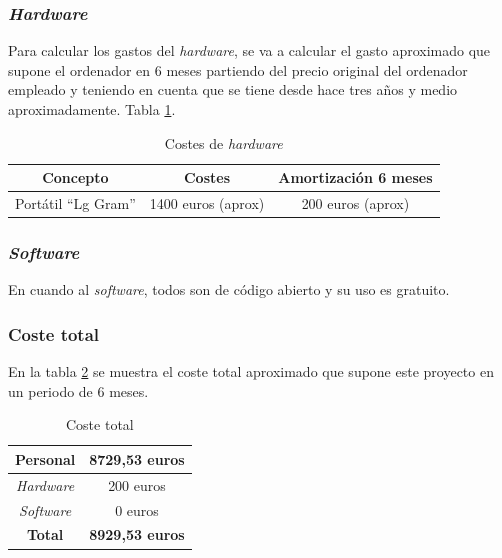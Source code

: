 \subsubsection{\textit{Hardware}}

Para calcular los gastos del \textit{hardware}, se va a calcular el gasto aproximado que supone el ordenador en 6 meses partiendo del precio original del ordenador empleado y teniendo en cuenta que se tiene desde hace tres años y medio aproximadamente. Tabla \ref{tab:hardware}.

\begin{table}[h]
    \centering
    \begin{tabular}{ccc}
        \toprule
        \textbf{Concepto} & \textbf{Costes} & \textbf{Amortización 6 meses}\\
        \toprule
        Portátil ``Lg Gram'' & 1400 euros (aprox) & 200 euros (aprox)\\
    \end{tabular}
    \caption{Costes de \textit{hardware}}
    \label{tab:hardware}
\end{table}

\subsubsection{\textit{Software}}

En cuando al \textit{software}, todos son de código abierto y su uso es gratuito.

\subsubsection{Coste total}

En la tabla \ref{tab:total} se muestra el coste total aproximado que supone este proyecto en un periodo de 6 meses. 

\begin{table}[h]
    \centering
    \begin{tabular}{cc}
        Personal & 8729,53 euros \\
        \toprule
        \textit{Hardware} & 200 euros\\
        \toprule
        \textit{Software} & 0 euros \\
        \toprule
         \textbf{Total} & \textbf{8929,53 euros} \\
    \end{tabular}
    \caption{Coste total}
    \label{tab:total}
\end{table}

